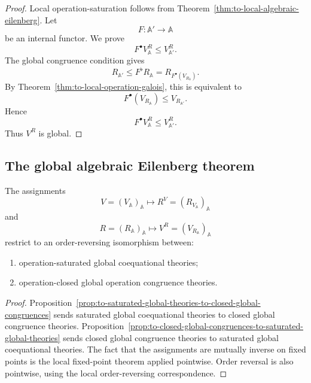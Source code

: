 \begin{proof}
    Local operation-saturation follows from
    Theorem~\ref{thm:to-local-algebraic-eilenberg}. Let
    \[
        F:\mathbb A'\to\mathbb A
    \]
    be an internal functor. We prove
    \[
        F^\bullet V^R_{\mathbb A}\leq V^R_{\mathbb A'}.
    \]
    The global congruence condition gives
    \[
        R_{\mathbb A'}\leq F^\flat R_{\mathbb A}
        =
        R_{F^\bullet(V_{R_{\mathbb A}})}.
    \]
    By Theorem~\ref{thm:to-local-operation-galois}, this is equivalent to
    \[
        F^\bullet(V_{R_{\mathbb A}})
        \leq
        V_{R_{\mathbb A'}}.
    \]
    Hence
    \[
        F^\bullet V^R_{\mathbb A}\leq V^R_{\mathbb A'}.
    \]
    Thus \(V^R\) is global.
\end{proof}

\subsection{The global algebraic Eilenberg theorem}
\label{subsec:to-global-algebraic-eilenberg-theorem}

\begin{theorem}
\label{thm:to-global-algebraic-eilenberg}
    The assignments
    \[
        V=(V_{\mathbb A})_{\mathbb A}
        \longmapsto
        R^V=(R_{V_{\mathbb A}})_{\mathbb A}
    \]
    and
    \[
        R=(R_{\mathbb A})_{\mathbb A}
        \longmapsto
        V^R=(V_{R_{\mathbb A}})_{\mathbb A}
    \]
    restrict to an order-reversing isomorphism between:
    \begin{enumerate}
        \item operation-saturated global coequational theories;
        \item operation-closed global operation congruence theories.
    \end{enumerate}
\end{theorem}

\begin{proof}
    Proposition~\ref{prop:to-saturated-global-theories-to-closed-global-congruences}
    sends saturated global coequational theories to closed global congruence
    theories. Proposition~\ref{prop:to-closed-global-congruences-to-saturated-global-theories}
    sends closed global congruence theories to saturated global coequational
    theories. The fact that the assignments are mutually inverse on fixed
    points is the local fixed-point theorem applied pointwise. Order reversal
    is also pointwise, using the local order-reversing correspondence.
\end{proof}

